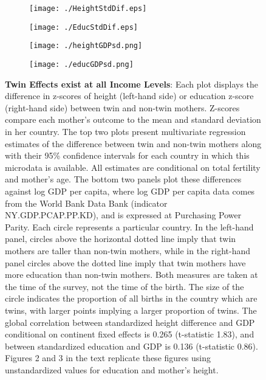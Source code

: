 \documentclass{nature}
\begin{document}
\begin{linenumbers}
\begin{spacing}{1}
\clearpage

\begin{figure}[htpb!]
\begin{subfigure}{.5\textwidth}
  \texttt{[image: ./HeightStdDif.eps]}
\end{subfigure}%
\begin{subfigure}{.5\textwidth}
  \texttt{[image: ./EducStdDif.eps]}
\end{subfigure}
\begin{subfigure}{.5\textwidth}
  \texttt{[image: ./heightGDPsd.png]}
\end{subfigure}%
\begin{subfigure}{.5\textwidth}
  \texttt{[image: ./educGDPsd.png]}
\end{subfigure}
\vspace{5mm}
\caption{\textbf{Twin Effects exist at all Income Levels}: {\footnotesize Each plot displays the difference in z-scores of height (left-hand side) or education z-score (right-hand side) between twin and non-twin mothers. Z-scores compare each mother's outcome to the mean and standard deviation in her country.  The top two plots present multivariate regression estimates of the difference between twin and non-twin mothers along with their 95\% confidence intervals for each country in which this microdata is available.  All estimates are conditional on total fertility and mother's age.  The bottom two panels plot these differences against log GDP per capita, where log GDP per capita data comes from the World Bank Data Bank (indicator NY.GDP.PCAP.PP.KD), and is expressed at Purchasing Power Parity.  Each circle represents a particular country.  In the left-hand panel, circles above the horizontal dotted line imply that twin mothers are taller than non-twin mothers, while in the right-hand panel circles above the dotted line imply that twin mothers have more education than non-twin mothers.  Both measures are taken at the time of the survey, not the time of the birth.  The size of the circle indicates the proportion of all births in the country which are twins, with larger points implying a larger proportion of twins. The global correlation between standardized height difference and GDP conditional on continent fixed effects is 0.265 (t-statistic 1.83), and between standardized education and GDP is 0.136 (t-statistic 0.86). Figures 2 and 3 in the text replicate these figures using unstandardized values for education and mother's height.}}
\end{figure}


\end{spacing}
\end{linenumbers}
\end{document}
